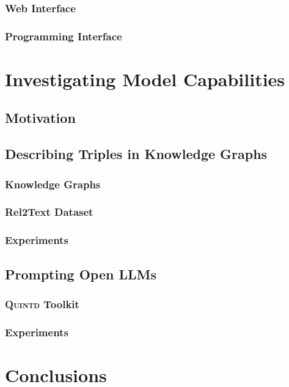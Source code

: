\documentclass[12pt,notitlepage,a4paper,openright]{report}
\begin{document}
\subsection{Web Interface}
\subsection{Programming Interface}


\chapter{Investigating Model Capabilities}
\section{Motivation}
\section{Describing Triples in Knowledge Graphs}
\subsection{Knowledge Graphs}
\subsection{Rel2Text Dataset}
\subsection{Experiments}
\section{Prompting Open LLMs}
\subsection{\textsc{Quintd} Toolkit}
\subsection{Experiments}




\chapter{Conclusions}


%
%

\renewcommand{\chapterheadstartvskip}{\vspace*{0mm}} %
\end{document}

